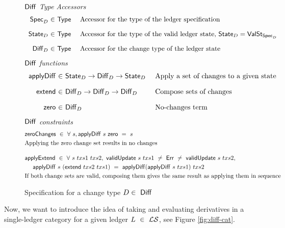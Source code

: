 \begin{figure*}[htb]
  \emph{$\mathsf{Diff}$ Type Accessors}
  \begin{equation*}
    \begin{array}{r@{~\in~}l@{~~~~}lr}
      \type{Spec}_D
      & \Type
      & \text{Accessor for the type of the ledger specification}
      \nextdef
      \type{State}_D
      & \Type
      & \text{Accessor for the type of the valid ledger state, $\type{State}_D = \type{ValSt}_{\type{Spec}_D}$}
      \nextdef
      \Diff_D
      & \Type
      & \text{Accessor for the change type of the ledger state}
    \end{array}
  \end{equation*}
  \emph{$\mathsf{Diff}$ functions}
  \begin{equation*}
    \begin{array}{r@{~\in~}l@{~~~~}lr}
      \fun{applyDiff} & \type{State}_D \to \Diff_D \to \type{State}_D &
      \text{Apply a set of changes to a given state}
      \nextdef
      \fun{extend} & \Diff_D \to \Diff_D \to \Diff_D &
      \text{Compose sets of changes}
      \nextdef
      \fun{zero} & \Diff_D  &
      \text{No-changes term}
    \end{array}
  \end{equation*}
  \emph{$\mathsf{Diff}$ constraints}
  \begin{align*}
      & \fun{zeroChanges} ~\in~\forall~s, \fun{applyDiff}~s~\fun{zero}~=~s  \\
      & \text{Applying the zero change set results in no changes}
      \nextdef
      &\fun{applyExtend} ~\in~ \forall~s~txs1~txs2,~\fun{validUpdate}~s~txs1~\neq~\Err~\neq~\fun{validUpdate}~s~txs2, \\
      &~~~~\fun{applyDiff}~s~ (\fun{extend}~txs2~txs1)~=~\fun{applyDiff} (\fun{applyDiff}~s~txs1)~txs2 \\
      & \text{If both change sets are valid, composing them gives the same result as applying them in sequence}
  \end{align*}
  \caption{Specification for a change type $D \in~\mathsf{Diff}$}
  \label{fig:diff}
\end{figure*}

Now, we want to introduce the idea of taking and evaluating derivatives in
a single-ledger category for a given ledger $L~\in~\mathcal{L}\mathcal{S}$, see Figure \ref{fig:diff-cat}.


